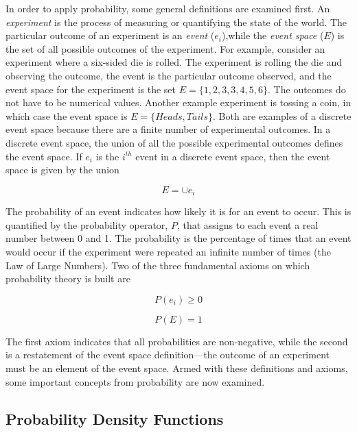 {In order to apply probability, some general definitions are examined
first. An \emph{experiment} is the process of measuring or quantifying
the state of the world. The particular outcome of an experiment is an
\emph{event} ($e_i$),while the
\emph{event space} ($E$) is the set of all possible outcomes of the
experiment. For example, consider an experiment where a six-sided die is
rolled. The experiment is rolling the die and observing the outcome, the
event is the particular outcome observed, and the event space for the
experiment is the set $E = \{1,2,3,3,4,5,6\}$. The outcomes do not
have to be numerical values. Another example experiment is tossing a
coin, in which case the event space is $E=\{Heads, Tails\}$. Both
are examples of a discrete event space because there are a finite number
of experimental outcomes. In a discrete event space, the union of all
the possible experimental outcomes defines the event space. If
$e_i$ is the $i^{th}$
event in a discrete event space, then the event space is given by the
union

\begin{equation}
\label{eventSpaceUnion}
E = \cup e_i
\end{equation}

The probability of an event indicates how likely it is for an event to
occur. This is quantified by the probability operator, $P$, that
assigns to each event a real number between 0 and 1. The probability is
the percentage of times that an event would occur if the experiment were
repeated an infinite number of times (the Law of Large Numbers). Two of
the three fundamental axioms on which probability theory is built are

\begin{equation}
\label{equ:probabbilityGreaterEqualZero}
P(e_i)  \geq 0
\end{equation}

\begin{equation}
\label{equ:totalProbabilityEqualOne}
P(E)  = 1
\end{equation}

The first axiom indicates that all probabilities are non-negative, while
the second is a restatement of the event space definition---the outcome
of an experiment must be an element of the event space. Armed with these
definitions and axioms, some important concepts from probability are now
examined.

\subsection{Probability Density Functions}
\label{subsection:probability-density-functions}

}
